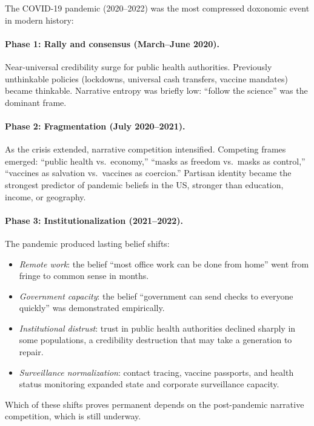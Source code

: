 \begin{example}
\label{ex:covid}
The COVID-19 pandemic (2020--2022) was the most compressed doxonomic event in modern history:

\paragraph{Phase 1: Rally and consensus (March--June 2020).}
Near-universal credibility surge for public health authorities.
Previously unthinkable policies (lockdowns, universal cash transfers, vaccine mandates) became thinkable.
Narrative entropy was briefly low: ``follow the science'' was the dominant frame.

\paragraph{Phase 2: Fragmentation (July 2020--2021).}
As the crisis extended, narrative competition intensified.
Competing frames emerged: ``public health vs.\ economy,'' ``masks as freedom vs.\ masks as control,'' ``vaccines as salvation vs.\ vaccines as coercion.''
Partisan identity became the strongest predictor of pandemic beliefs in the US, stronger than education, income, or geography.

\paragraph{Phase 3: Institutionalization (2021--2022).}
The pandemic produced lasting belief shifts:
\begin{itemize}[nosep]
  \item \emph{Remote work}: the belief ``most office work can be done from home'' went from fringe to common sense in months.
  \item \emph{Government capacity}: the belief ``government can send checks to everyone quickly'' was demonstrated empirically.
  \item \emph{Institutional distrust}: trust in public health authorities declined sharply in some populations, a credibility destruction that may take a generation to repair.
  \item \emph{Surveillance normalization}: contact tracing, vaccine passports, and health status monitoring expanded state and corporate surveillance capacity.
\end{itemize}
Which of these shifts proves permanent depends on the post-pandemic narrative competition, which is still underway.
\end{example}

